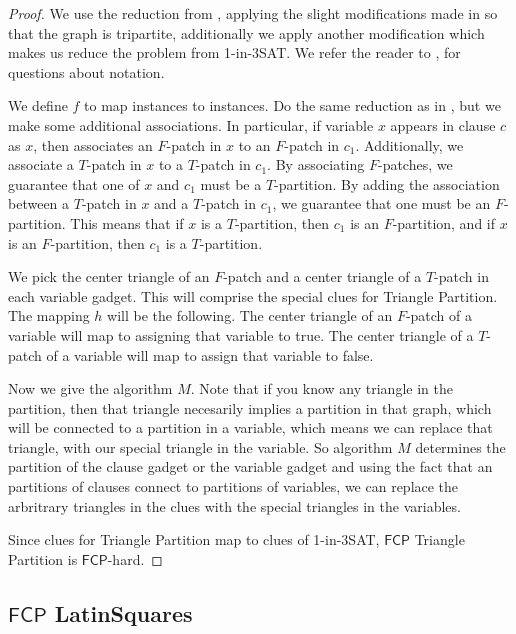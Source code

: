 \documentclass[runningheads,a4paper]{llncs}
\begin{document}
\begin{proof}
We use the reduction from \cite{holyer1981np}, applying the slight modifications made in \cite{colbourn1984complexity} so that the graph is tripartite, additionally we apply another modification which makes us reduce the problem from 1-in-3SAT. We refer the reader to \cite{holyer1981np}, \cite{colbourn1984complexity} for questions about notation.

We define $f$ to map instances to instances. Do the same reduction as in \cite{holyer1981np}, but we make some additional associations. In particular, if variable $x$ appears in clause $c$ as $x$, then \cite{holyer1981np} associates an $F$-patch in $x$ to an $F$-patch in $c_1$. Additionally, we associate a $T$-patch in $x$ to a $T$-patch in $c_1$. By associating $F$-patches, we guarantee that one of $x$ and $c_1$ must be a $T$-partition. By adding the association between a $T$-patch in $x$ and a $T$-patch in $c_1$, we guarantee that one must be an $F$-partition. This means that if $x$ is a $T$-partition, then $c_1$ is an $F$-partition, and if $x$ is an $F$-partition, then $c_1$ is a $T$-partition.

We pick the center triangle of an $F$-patch and a center triangle of a $T$-patch in each variable gadget. This will comprise the special clues for Triangle Partition. The mapping $h$ will be the following. The center triangle of an $F$-patch of a variable will map to assigning that variable to true. The center triangle of a $T$-patch of a variable will map to assign that variable to false. 

Now we give the algorithm $M$. Note that if you know any triangle in the partition, then that triangle necesarily implies a partition in that graph, which will be connected to a partition in a variable, which means we can replace that triangle, with our special triangle in the variable. So algorithm $M$ determines the partition of the clause gadget or the variable gadget and using the fact that an partitions of clauses connect to partitions of variables, we can replace the arbritrary triangles in the clues with the special triangles in the variables. 

Since clues for Triangle Partition map to clues of 1-in-3SAT, $\mathsf{FCP}$ Triangle Partition is $\mathsf{FCP}$-hard.
\end{proof}

\subsection{$\mathsf{FCP}$ LatinSquares}
\end{document}
